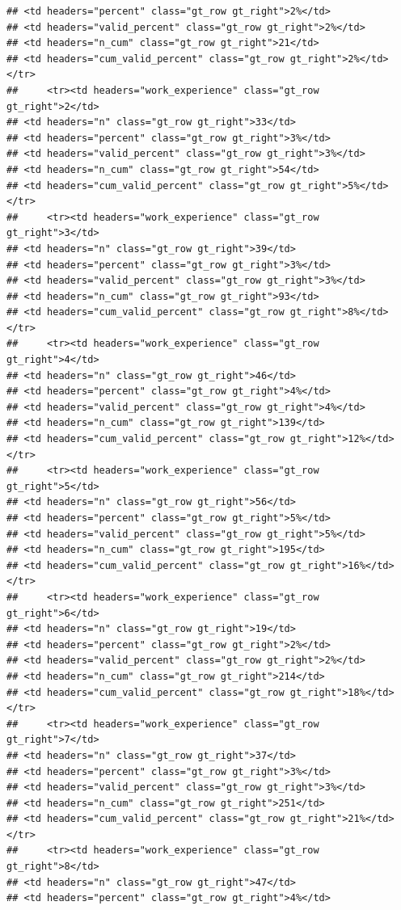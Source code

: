 \documentclass[
  a4paper,
  DIV=11,
  numbers=noendperiod]{scrartcl}
\begin{document}
\begin{verbatim}
## <td headers="percent" class="gt_row gt_right">2%</td>
## <td headers="valid_percent" class="gt_row gt_right">2%</td>
## <td headers="n_cum" class="gt_row gt_right">21</td>
## <td headers="cum_valid_percent" class="gt_row gt_right">2%</td></tr>
##     <tr><td headers="work_experience" class="gt_row gt_right">2</td>
## <td headers="n" class="gt_row gt_right">33</td>
## <td headers="percent" class="gt_row gt_right">3%</td>
## <td headers="valid_percent" class="gt_row gt_right">3%</td>
## <td headers="n_cum" class="gt_row gt_right">54</td>
## <td headers="cum_valid_percent" class="gt_row gt_right">5%</td></tr>
##     <tr><td headers="work_experience" class="gt_row gt_right">3</td>
## <td headers="n" class="gt_row gt_right">39</td>
## <td headers="percent" class="gt_row gt_right">3%</td>
## <td headers="valid_percent" class="gt_row gt_right">3%</td>
## <td headers="n_cum" class="gt_row gt_right">93</td>
## <td headers="cum_valid_percent" class="gt_row gt_right">8%</td></tr>
##     <tr><td headers="work_experience" class="gt_row gt_right">4</td>
## <td headers="n" class="gt_row gt_right">46</td>
## <td headers="percent" class="gt_row gt_right">4%</td>
## <td headers="valid_percent" class="gt_row gt_right">4%</td>
## <td headers="n_cum" class="gt_row gt_right">139</td>
## <td headers="cum_valid_percent" class="gt_row gt_right">12%</td></tr>
##     <tr><td headers="work_experience" class="gt_row gt_right">5</td>
## <td headers="n" class="gt_row gt_right">56</td>
## <td headers="percent" class="gt_row gt_right">5%</td>
## <td headers="valid_percent" class="gt_row gt_right">5%</td>
## <td headers="n_cum" class="gt_row gt_right">195</td>
## <td headers="cum_valid_percent" class="gt_row gt_right">16%</td></tr>
##     <tr><td headers="work_experience" class="gt_row gt_right">6</td>
## <td headers="n" class="gt_row gt_right">19</td>
## <td headers="percent" class="gt_row gt_right">2%</td>
## <td headers="valid_percent" class="gt_row gt_right">2%</td>
## <td headers="n_cum" class="gt_row gt_right">214</td>
## <td headers="cum_valid_percent" class="gt_row gt_right">18%</td></tr>
##     <tr><td headers="work_experience" class="gt_row gt_right">7</td>
## <td headers="n" class="gt_row gt_right">37</td>
## <td headers="percent" class="gt_row gt_right">3%</td>
## <td headers="valid_percent" class="gt_row gt_right">3%</td>
## <td headers="n_cum" class="gt_row gt_right">251</td>
## <td headers="cum_valid_percent" class="gt_row gt_right">21%</td></tr>
##     <tr><td headers="work_experience" class="gt_row gt_right">8</td>
## <td headers="n" class="gt_row gt_right">47</td>
## <td headers="percent" class="gt_row gt_right">4%</td>

\end{verbatim}
\end{document}
